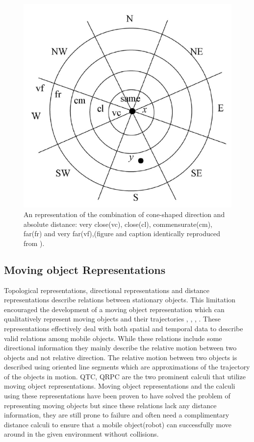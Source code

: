 		\begin{figure}[h]
			\centering
			\includegraphics[scale=0.8]{images/argd_delta}
			\caption{An representation of the combination of cone-shaped direction and absolute distance: very
				close(vc), close(cl), commensurate(cm), far(fr) and very far(vf),(figure and caption identically reproduced from \cite{clementini1997qualitative}).}
			\label{fig:argddelta}
		\end{figure}
		
		
		\subsection{Moving object Representations}  Topological representations, directional representations
		 and distance representations describe relations between stationary objects. This limitation encouraged the development of a moving object representation which can qualitatively represent moving objects and their trajectories \cite{cohn1997qualitative}, \cite{chen2015survey}, \cite{cohn2001qualitative}, \cite{cohn2008qualitative} . These representations effectively deal with both spatial and temporal data to describe valid relations among mobile objects. While these relations include some directional information they mainly describe the relative motion between two objects and not relative direction. The relative motion between two objects is described using oriented line segments which are approximations of the trajectory of the objects in motion. QTC, QRPC are the two prominent calculi that utilize moving object representations. Moving object representations and the calculi using these representations have been proven to have solved the problem of representing moving objects but since these relations lack any distance information, they are still prone to failure and often need a complimentary distance calculi to ensure that a mobile object(robot) can successfully move around in the given environment without collisions.
		

